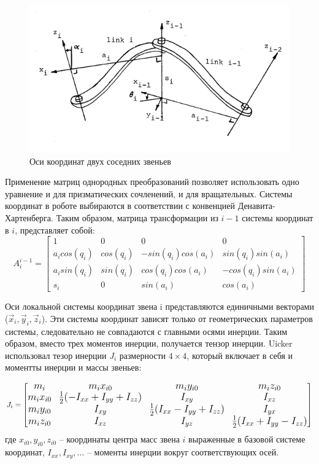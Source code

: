 	\begin{figure}[H]
	\center\includegraphics[width=0.8\linewidth]{1.png}
	\caption{Оси координат двух соседних звеньев}
	\label{fig:scr1}
	\end{figure}

Применение матриц однородных преобразований позволяет использовать одно уравнение и для призматических сочленений, и для вращательных. Системы координат в роботе выбираются в соответствии с конвенцией Денавита-Хартенберга. Таким образом, матрица трансформации из $i-1$ системы координат в $i$, представляет собой:
\begin{equation}
A_i^{i-1} = 
\begin{bmatrix}
1 & 0 & 0 & 0\\
a_i cos (q_i) & cos (q_i) & -sin (q_i) cos (a_i) & sin (q_i) sin (a_i)\\
a_i sin (q_i) & sin (q_i) & cos (q_i) cos (a_i) & -cos (q_i) sin (a_i)\\
s_i & 0 & sin (a_i) & cos (a_i)
\end{bmatrix}
\end{equation}

Оси локальной системы координат звена i представляются единичными векторами ($\vec x_i, \vec y_i, \vec z_i$). Эти системы координат зависят только от геометрических параметров системы, следовательно не совпадаются с главными осями инерции. Таким образом, вместо трех моментов инерции, получается тензор инерции. Uicker использовал тезор инерции $J_i$ размерности $4 \times 4$, который включает в себя и моментты инерции и массы звеньев:


\begin{equation}
\begingroup\makeatletter\def\f@size{14}\check@mathfonts
J_i = 
\begin{bmatrix}
m_i & m_i x_{i0} & m_i y_{i0} & m_i z_{i0}\\
m_i x_{i0} & \frac{1}{2} (-I_{xx} + I_{yy} + I_{zz}) & I_{xy} & I_{xz}\\
m_i y_{i0} & I_{xy} & \frac{1}{2} (I_{xx} - I_{yy} + I_{zz}) & I_{yx} \\
m_i z_{i0} & I_{xz} & I_{yz} & \frac{1}{2} (I_{xx} + I_{yy} - I_{zz})
\end{bmatrix}
\endgroup
\end{equation}
где $x_{i0}, y_{i0}, z_{i0}$ -- координаты центра масс звена $i$ выраженные в базовой системе координат, $I_{xx}, I_{xy},...$ -- моменты инерции вокруг соответствующих осей.

